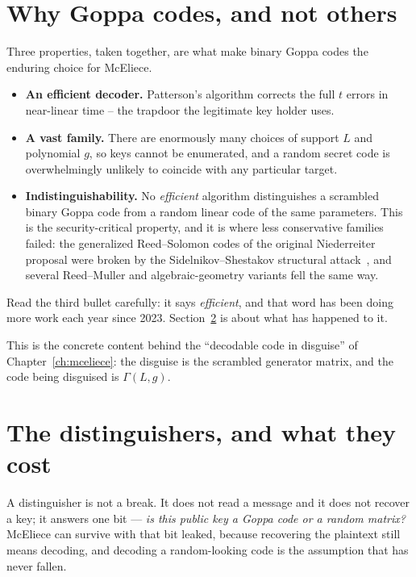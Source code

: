 \section{Why Goppa codes, and not others}

Three properties, taken together, are what make binary Goppa codes the enduring choice for McEliece.

\begin{itemize}
  \item \textbf{An efficient decoder.} Patterson's algorithm corrects the full $t$ errors in near-linear time -- the trapdoor the legitimate key holder uses.
  \item \textbf{A vast family.} There are enormously many choices of support $L$ and polynomial $g$, so keys cannot be enumerated, and a random secret code is overwhelmingly unlikely to coincide with any particular target.
  \item \textbf{Indistinguishability.} No \emph{efficient} algorithm distinguishes a scrambled binary Goppa code from a random linear code of the same parameters. This is the security-critical property, and it is where less conservative families failed: the generalized Reed--Solomon codes of the original Niederreiter proposal were broken by the Sidelnikov--Shestakov structural attack~\cite{ss1992}, and several Reed--Muller and algebraic-geometry variants fell the same way.
\end{itemize}

Read the third bullet carefully: it says \emph{efficient}, and that word has been doing more work each year since 2023. Section~\ref{sec:goppa-distinguishers} is about what has happened to it.

This is the concrete content behind the ``decodable code in disguise'' of Chapter~\ref{ch:mceliece}: the disguise is the scrambled generator matrix, and the code being disguised is $\Gamma(L,g)$.

\section{The distinguishers, and what they cost}
\label{sec:goppa-distinguishers}

A distinguisher is not a break. It does not read a message and it does not recover a key; it answers one bit --- \emph{is this public key a Goppa code or a random matrix?} McEliece can survive with that bit leaked, because recovering the plaintext still means decoding, and decoding a random-looking code is the assumption that has never fallen.

